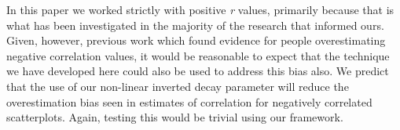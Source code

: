 \documentclass[preprint, 3p,
authoryear]{elsarticle} %
\begin{document}
In this paper we worked strictly with positive \emph{r} values,
primarily because that is what has been investigated in the majority of
the research that informed ours. Given, however, previous work
\citep{sher_2017} which found evidence for people overestimating
negative correlation values, it would be reasonable to expect that the
technique we have developed here could also be used to address this bias
also. We predict that the use of our non-linear inverted decay parameter
will reduce the overestimation bias seen in estimates of correlation for
negatively correlated scatterplots. Again, testing this would be trivial
using our framework.

\renewcommand\refname{References}

\end{document}
